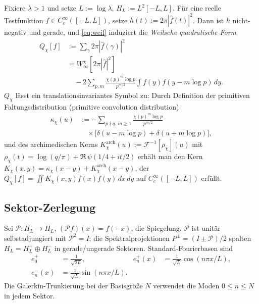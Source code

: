 \documentclass[10pt,twocolumn]{article}
\theoremstyle{definition}
\theoremstyle{remark}
\newcommand{\chifn}{\chi}
\begin{document}
Fixiere $\lambda>1$ und setze $L:=\log\lambda$, $H_L:=L^2[-L,L]$. Für eine
reelle Testfunktion $f\in C_c^\infty([-L,L])$, setze
$h(t):=2\pi|\hat f(t)|^2$. Dann ist $h$ nicht-negativ und gerade, und
\eqref{eq:weil} induziert die \emph{Weilsche quadratische Form}
\begin{equation}
\label{eq:weil-qf}
\begin{aligned}
  Q_{\chifn}[f]
    &:=\sum_{\gamma}2\pi|\hat f(\gamma)|^2 \\
    &=W^{\chifn}_\infty[2\pi|\hat f|^2] \\
    &\quad -2\sum_{p,m}\frac{\chifn(p)^m\log p}{p^{m/2}}
      \int f(y)f(y-m\log p)\,dy.
\end{aligned}
\end{equation}
$Q_{\chifn}$ lässt ein translationsinvariantes Symbol zu: Durch Definition der
primitiven Faltungsdistribution (primitive convolution distribution)
\begin{equation}
\label{eq:kappa}
\begin{aligned}
  \kappa_{\chifn}(u)
    &:=-\sum_{p\nmid q,\,m\geq 1}
      \frac{\chifn(p)^m\log p}{p^{m/2}} \\
    &\quad\times
      \bigl[\delta(u-m\log p)+\delta(u+m\log p)\bigr],
\end{aligned}
\end{equation}
und des archimedischen Kerns
$K^{\mathrm{arch}}_{\chifn}(u):=\mathcal{F}^{-1}[\rho_{\chifn}](u)$
mit $\rho_{\chifn}(t)=\log(q/\pi)+\Re\,\psi(1/4+it/2)$ erhält man
den Kern
$K_{\chifn}(x,y)=\kappa_{\chifn}(x-y)+K^{\mathrm{arch}}_{\chifn}(x-y)$,
der $Q_{\chifn}[f]=\iint K_{\chifn}(x,y)f(x)f(y)\,dx\,dy$ auf
$C_c^\infty([-L,L])$ erfüllt.

\subsection{Sektor-Zerlegung}

Sei $\mathcal{P}:H_L\to H_L$, $(\mathcal{P}f)(x)=f(-x)$, die
Spiegelung. $\mathcal{P}$ ist unitär selbstadjungiert mit $\mathcal{P}^2
=I$; die Spektralprojektionen $P^\pm=(I\pm\mathcal{P})/2$ spalten
$H_L=H_L^+\oplus H_L^-$ in gerade/ungerade Sektoren. Standard-Fourierbasen
sind
\[
\begin{aligned}
  e_0^+&=\tfrac{1}{\sqrt{2L}}, &
  e_n^+(x)&=\tfrac{1}{\sqrt L}\cos(n\pi x/L),\\
  e_n^-(x)&=\tfrac{1}{\sqrt L}\sin(n\pi x/L).
\end{aligned}
\]
Die Galerkin-Trunkierung bei der Basisgröße $N$ verwendet die Moden $0\leq n\leq N$
in jedem Sektor.
\end{document}

